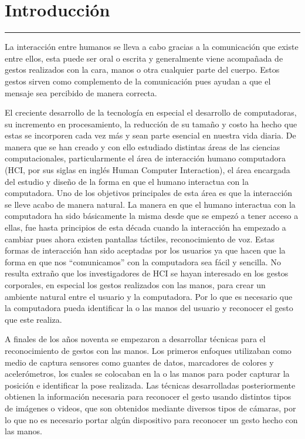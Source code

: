 \chapter{Introducci\'on}\label{capit:cap1}
\vspace{-2.0325ex}%
\noindent
\rule{\textwidth}{0.5pt}
\vspace{-5.5ex}%
\newcommand{\pushline}{\Indp}%

La interacción entre humanos se lleva a cabo gracias a la comunicación  que existe entre ellos, esta puede ser oral o escrita y generalmente viene acompañada de gestos realizados con la cara, manos o otra cualquier parte del cuerpo. 
Estos gestos sirven como complemento de la comunicación pues ayudan a que el mensaje sea percibido de manera correcta.

El creciente desarrollo de la tecnología en especial el desarrollo de computadoras, su incremento en procesamiento, la reducción de su tamaño y costo ha hecho que estas se incorporen cada vez más y sean parte esencial en nuestra vida diaria. De manera que se han creado y con ello estudiado distintas áreas de las ciencias computacionales, particularmente el área de interacción humano computadora (HCI, por sus siglas en ingl\'es Human Computer Interaction), el área encargada del estudio y diseño de la forma en que el humano interactua con la computadora. 
Uno de los objetivos principales de esta área es que la interacción se lleve acabo de manera natural. 
La manera en que el humano interactua con la computadora ha sido básicamente la misma desde que se empezó a tener acceso a ellas, fue hasta principios de esta década cuando la interacción ha empezado a cambiar pues ahora existen pantallas táctiles, reconocimiento de voz. Estas formas de interacción han sido aceptadas por los usuarios ya que hacen que la forma en que nos ``comunicamos'' con la computadora sea fácil y sencilla. No resulta extraño que los investigadores de HCI se hayan interesado en los gestos corporales, en especial los gestos realizados con las manos, para crear un ambiente natural entre el usuario y la computadora.  
Por lo que es necesario que la computadora pueda identificar la o las manos del usuario y reconocer el gesto que este realiza. 

A finales de los años noventa se empezaron a desarrollar t\'ecnicas para  el reconocimiento de gestos con las manos. Los primeros enfoques utilizaban como medio de captura sensores como guantes de datos, marcadores de colores y acelerómetros, los cuales se colocaban en la o las manos para poder capturar la posición e identificar la pose realizada. 
Las técnicas desarrolladas posteriormente obtienen la información necesaria para reconocer el gesto usando distintos tipos de imágenes o videos, que son obtenidos mediante diversos tipos de cámaras, por lo que no es necesario portar algún dispositivo para reconocer un gesto hecho con las manos.

